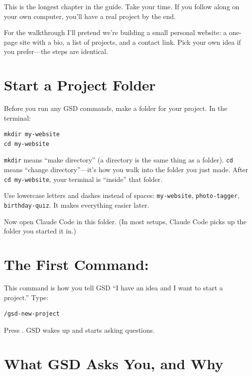 \documentclass[11pt,letterpaper,openany]{book}
\begin{document}
This is the longest chapter in the guide. Take your time. If you follow
along on your own computer, you'll have a real project by the end.

For the walkthrough I'll pretend we're building a small personal website:
a one-page site with a bio, a list of projects, and a contact link. Pick
your own idea if you prefer---the steps are identical.

\section{Start a Project Folder}

Before you run any GSD commands, make a folder for your project. In the
terminal:

\begin{lstlisting}
mkdir my-website
cd my-website
\end{lstlisting}

\texttt{mkdir} means ``make directory'' (a directory is the same thing as
a folder). \texttt{cd} means ``change directory''---it's how you walk
into the folder you just made. After \texttt{cd my-website}, your
terminal is ``inside'' that folder.

\begin{gsdtip}
Use lowercase letters and dashes instead of spaces: \texttt{my-website},
\texttt{photo-tagger}, \texttt{birthday-quiz}. It makes everything easier
later.
\end{gsdtip}

Now open Claude Code in this folder. (In most setups, Claude Code picks
up the folder you started it in.)

\section{The First Command: }

This command is how you tell GSD ``I have an idea and I want to start a
project.'' Type:

\begin{lstlisting}
/gsd-new-project
\end{lstlisting}

Press . GSD wakes up and starts asking questions.

\section{What GSD Asks You, and Why}
\end{document}
